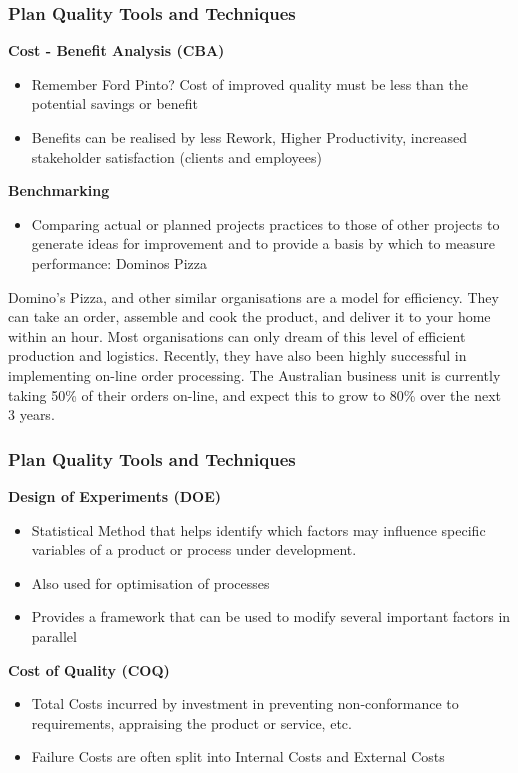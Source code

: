 \begin{frame}
\frametitle{Plan Quality \hfill Tools and Techniques}
\textbf{Cost - Benefit Analysis (CBA)}\\
\begin{itemize}
	\item Remember Ford Pinto?  Cost of improved quality must be less than the potential savings or benefit
	\item Benefits can be realised by less Rework, Higher Productivity, increased stakeholder satisfaction (clients and employees)
\end{itemize}
	
\textbf{Benchmarking }

\begin{itemize}
	\item Comparing actual or planned projects practices to those of other projects to generate ideas for improvement and to provide a basis by which to measure performance: Dominos Pizza
\end{itemize}
\end{frame}

Domino's Pizza, and other similar organisations are a model for efficiency.  They can take an order, assemble and cook the product, and deliver it to your home within an hour.  Most organisations can only dream of this level of efficient production and logistics.  Recently, they have also been highly successful in implementing on-line order processing.  The Australian business unit is currently taking 50\% of their orders on-line, and expect this to grow to 80\% over the next 3 years.



\begin{frame}
\frametitle{Plan Quality \hfill Tools and Techniques}
\textbf{Design of Experiments (DOE)}\\
\begin{itemize}
	\item Statistical Method that helps identify which factors may influence specific variables of a product or process under development.
	\item Also used for optimisation of processes
	\item Provides a framework that can be used to modify several important factors in parallel
\end{itemize}
\textbf{Cost of Quality (COQ)}
\begin{itemize}
	\item Total Costs incurred by investment in preventing non-conformance to requirements, appraising the product or service, etc.
	\item Failure Costs are often split into Internal Costs and External Costs
\end{itemize}
\end{frame}




